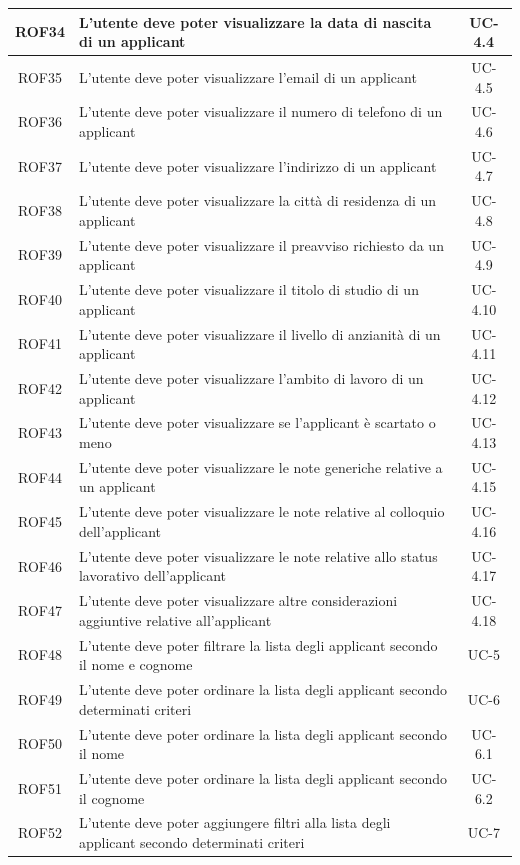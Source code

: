\begin{center}
\begin{tabularx}{\textwidth}{|c|X|c|}
		\hline
		ROF34 & L'utente deve poter visualizzare la data di nascita di un applicant& UC-4.4 \\
		\hline
		ROF35 & L'utente deve poter visualizzare l'email di un applicant& UC-4.5\\
		\hline
		ROF36 & L'utente deve poter visualizzare il numero di telefono di un applicant& UC-4.6\\
		\hline
		ROF37 & L'utente deve poter visualizzare l'indirizzo di un applicant& UC-4.7\\
		\hline
		ROF38 & L'utente deve poter visualizzare la città di residenza di un applicant&  UC-4.8\\
		\hline
		ROF39 & L'utente deve poter visualizzare il preavviso richiesto da un applicant & UC-4.9 \\
		\hline
		ROF40 &  L'utente deve poter visualizzare il titolo di studio di un applicant & UC-4.10\\
		\hline 
		ROF41 &  L'utente deve poter visualizzare il livello di anzianità di un applicant& UC-4.11\\
		\hline
		ROF42 &  L'utente deve poter visualizzare l'ambito di lavoro di un applicant& UC-4.12\\
		\hline
		ROF43 &  L'utente deve poter visualizzare se l'applicant è scartato o meno & UC-4.13\\
		\hline
		ROF44 &  L'utente deve poter visualizzare le note generiche relative a un applicant & UC-4.15\\
		\hline
		ROF45 &  L'utente deve poter visualizzare le note relative al colloquio dell'applicant & UC-4.16\\
		\hline
		ROF46 &  L'utente deve poter visualizzare le note relative allo status lavorativo dell'applicant& UC-4.17\\
		\hline
		ROF47 & L'utente deve poter visualizzare altre considerazioni aggiuntive relative all'applicant & UC-4.18\\
		\hline
		ROF48 & L'utente deve poter filtrare la lista degli applicant secondo il nome e cognome & UC-5\\
		\hline
		ROF49 & L'utente deve poter ordinare la lista degli applicant secondo determinati criteri & UC-6 \\
		\hline
		ROF50 & L'utente deve poter ordinare la lista degli applicant secondo il nome & UC-6.1\\
		\hline
		ROF51 & L'utente deve poter ordinare la lista degli applicant secondo il cognome & UC-6.2\\
		\hline
		ROF52 & L'utente deve poter aggiungere filtri alla lista degli applicant secondo determinati criteri &  UC-7\\

\end{tabularx}
\end{center}
